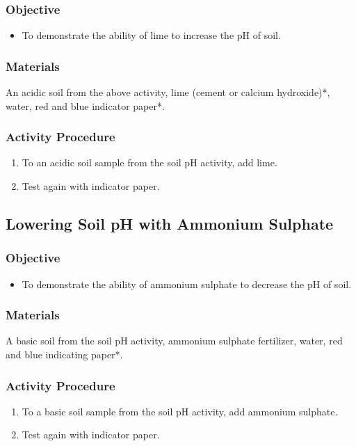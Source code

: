 \subsubsection{Objective}
\begin{itemize}
\item{To demonstrate the ability of lime to increase the pH of soil.}
\end{itemize}

\subsubsection{Materials}
An acidic soil from the above activity, lime (cement or calcium hydroxide)*, water, red and blue indicator paper*.

\subsubsection{Activity Procedure}
\begin{enumerate}
\item{To an acidic soil sample from the soil pH activity, add lime.}
\item{Test again with indicator paper.}
\end{enumerate}

\subsection{Lowering Soil pH with Ammonium Sulphate}

\subsubsection{Objective}
\begin{itemize}
\item{To demonstrate the ability of ammonium sulphate to decrease the pH of soil.}
\end{itemize}

\subsubsection{Materials}
A basic soil from the soil pH activity, ammonium sulphate fertilizer, water, red and blue indicating paper*.

\subsubsection{Activity Procedure}
\begin{enumerate}
\item{To a basic soil sample from the soil pH activity, add ammonium sulphate.}
\item{Test again with indicator paper.}
\end{enumerate}

